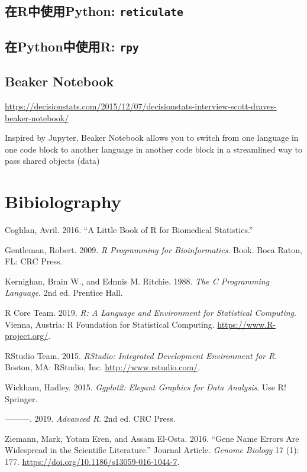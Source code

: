 \documentclass[]{book}
\begin{document}
\hypertarget{rpython-reticulate}{%
\section{\texorpdfstring{在R中使用Python: \texttt{reticulate}}{在R中使用Python: reticulate}}\label{rpython-reticulate}}

\hypertarget{pythonr-rpy}{%
\section{\texorpdfstring{在Python中使用R: \texttt{rpy}}{在Python中使用R: rpy}}\label{pythonr-rpy}}

\hypertarget{beaker-notebook}{%
\section{Beaker Notebook}\label{beaker-notebook}}

\url{https://decisionstats.com/2015/12/07/decisionstats-interview-scott-draves-beaker-notebook/}

Inspired by Jupyter, Beaker Notebook allows you to switch from one language in one code block to another language in another code block in a streamlined way to pass shared objects (data)

\hypertarget{bibiolography}{%
\chapter*{Bibiolography}\label{bibiolography}}

\hypertarget{refs}{}
\leavevmode\hypertarget{ref-Coghlan:2016}{}%
Coghlan, Avril. 2016. ``A Little Book of R for Biomedical Statistics.''

\leavevmode\hypertarget{ref-Gentleman2009R-Programming-Bioinfo}{}%
Gentleman, Robert. 2009. \emph{R Programming for Bioinformatics}. Book. Boca Raton, FL: CRC Press.

\leavevmode\hypertarget{ref-Kernighan1988The-C-Programming-La}{}%
Kernighan, Brain W., and Ednnis M. Ritchie. 1988. \emph{The C Programming Language}. 2nd ed. Prentice Hall.

\leavevmode\hypertarget{ref-R-base}{}%
R Core Team. 2019. \emph{R: A Language and Environment for Statistical Computing}. Vienna, Austria: R Foundation for Statistical Computing. \url{https://www.R-project.org/}.

\leavevmode\hypertarget{ref-R-rstudio}{}%
RStudio Team. 2015. \emph{RStudio: Integrated Development Environment for R}. Boston, MA: RStudio, Inc. \url{http://www.rstudio.com/}.

\leavevmode\hypertarget{ref-Wickham2015ggplot2-Elegant-Gra}{}%
Wickham, Hadley. 2015. \emph{Ggplot2: Elegant Graphics for Data Analysis}. Use R! Springer.

\leavevmode\hypertarget{ref-Wickham:2019}{}%
---------. 2019. \emph{Advanced R}. 2nd ed. CRC Press.

\leavevmode\hypertarget{ref-Ziemann2016Gene-name-errors}{}%
Ziemann, Mark, Yotam Eren, and Assam El-Osta. 2016. ``Gene Name Errors Are Widespread in the Scientific Literature.'' Journal Article. \emph{Genome Biology} 17 (1): 177. \url{https://doi.org/10.1186/s13059-016-1044-7}.
\end{document}

